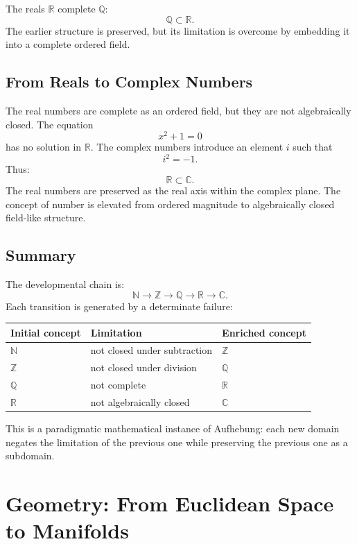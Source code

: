 \documentclass[11pt]{article}
\begin{document}
The reals $\mathbb{R}$ complete $\mathbb{Q}$:
\[
\mathbb{Q} \subset \mathbb{R}.
\]
The earlier structure is preserved, but its limitation is overcome by embedding it into a complete ordered field.

\subsection{From Reals to Complex Numbers}

The real numbers are complete as an ordered field, but they are not algebraically closed. The equation
\[
x^2+1=0
\]
has no solution in $\mathbb{R}$. The complex numbers introduce an element $i$ such that
\[
i^2=-1.
\]
Thus:
\[
\mathbb{R} \subset \mathbb{C}.
\]
The real numbers are preserved as the real axis within the complex plane. The concept of number is elevated from ordered magnitude to algebraically closed field-like structure.

\subsection{Summary}

The developmental chain is:
\[
\mathbb{N}
\longrightarrow
\mathbb{Z}
\longrightarrow
\mathbb{Q}
\longrightarrow
\mathbb{R}
\longrightarrow
\mathbb{C}.
\]
Each transition is generated by a determinate failure:

\begin{center}
\begin{tabular}{lll}
\toprule
Initial concept & Limitation & Enriched concept \\
\midrule
$\mathbb{N}$ & not closed under subtraction & $\mathbb{Z}$ \\
$\mathbb{Z}$ & not closed under division & $\mathbb{Q}$ \\
$\mathbb{Q}$ & not complete & $\mathbb{R}$ \\
$\mathbb{R}$ & not algebraically closed & $\mathbb{C}$ \\
\bottomrule
\end{tabular}
\end{center}

This is a paradigmatic mathematical instance of Aufhebung: each new domain negates the limitation of the previous one while preserving the previous one as a subdomain.

\section{Geometry: From Euclidean Space to Manifolds}
\end{document}
